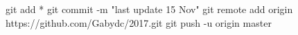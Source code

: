 git add *
git commit -m "last update 15 Nov"
git remote add origin https://github.com/Gabydc/2017.git
git push -u origin master
